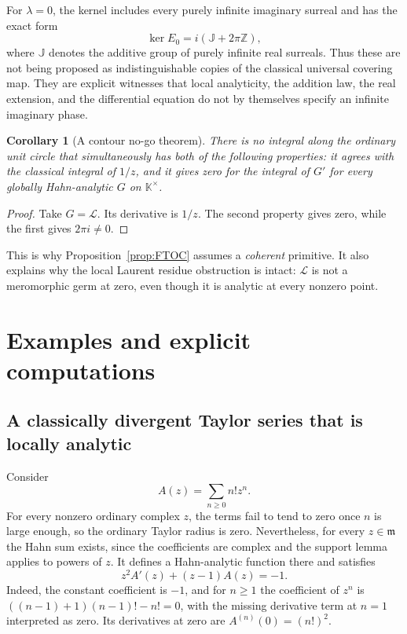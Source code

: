 \documentclass[11pt,a4paper]{article}
\numberwithin{equation}{section}
\newtheorem{corollary}[theorem]{Corollary}
\theoremstyle{definition}
\theoremstyle{remark}
\newcommand{\K}{\mathbb K}
\newcommand{\Z}{\mathbb Z}
\newcommand{\mm}{\mathfrak m}
\newcommand{\Logg}{\mathcal L}
\begin{document}
For $\lambda=0$, the kernel includes every purely infinite imaginary surreal and has the exact form
\[
 \ker E_0=i(\mathbb J+2\pi\Z),
\]
where $\mathbb J$ denotes the additive group of purely infinite real surreals. Thus these are not being proposed as indistinguishable copies of the classical universal covering map. They are explicit witnesses that local analyticity, the addition law, the real extension, and the differential equation do not by themselves specify an infinite imaginary phase.

\begin{corollary}[A contour no-go theorem]
\label{cor:nogo}
There is no integral along the ordinary unit circle that simultaneously has both of the following properties: it agrees with the classical integral of $1/z$, and it gives zero for the integral of $G'$ for every globally Hahn-analytic $G$ on $\K^\times$.
\end{corollary}
\begin{proof}
Take $G=\Logg$. Its derivative is $1/z$. The second property gives zero, while the first gives $2\pi i\ne0$.
\end{proof}
This is why Proposition~\ref{prop:FTOC} assumes a \emph{coherent} primitive. It also explains why the local Laurent residue obstruction is intact: $\Logg$ is not a meromorphic germ at zero, even though it is analytic at every nonzero point.

\section{Examples and explicit computations}
\label{sec:examples}
\subsection{A classically divergent Taylor series that is locally analytic}
Consider
\[
 A(z)=\sum_{n\geq0}n!z^n.
\]
For every nonzero ordinary complex $z$, the terms fail to tend to zero once $n$ is large enough, so the ordinary Taylor radius is zero. Nevertheless, for every $z\in\mm$ the Hahn sum exists, since the coefficients are complex and the support lemma applies to powers of $z$. It defines a Hahn-analytic function there and satisfies
\begin{equation}
\label{eq:euler}
 z^2A'(z)+(z-1)A(z)=-1.
\end{equation}
Indeed, the constant coefficient is $-1$, and for $n\geq1$ the coefficient of $z^n$ is
$((n-1)+1)(n-1)!-n!=0$, with the missing derivative term at $n=1$ interpreted as zero. Its derivatives at zero are $A^{(n)}(0)=(n!)^2$.
\end{document}
